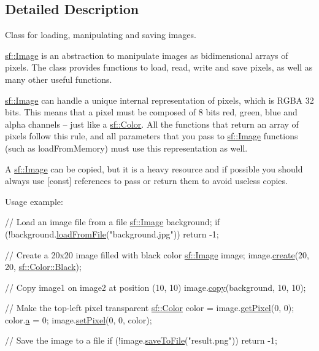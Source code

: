 \subsection{Detailed Description}
Class for loading, manipulating and saving images. 

\hyperlink{classsf_1_1_image}{sf\-::\-Image} is an abstraction to manipulate images as bidimensional arrays of pixels. The class provides functions to load, read, write and save pixels, as well as many other useful functions.

\hyperlink{classsf_1_1_image}{sf\-::\-Image} can handle a unique internal representation of pixels, which is R\-G\-B\-A 32 bits. This means that a pixel must be composed of 8 bits red, green, blue and alpha channels -- just like a \hyperlink{classsf_1_1_color}{sf\-::\-Color}. All the functions that return an array of pixels follow this rule, and all parameters that you pass to \hyperlink{classsf_1_1_image}{sf\-::\-Image} functions (such as load\-From\-Memory) must use this representation as well.

A \hyperlink{classsf_1_1_image}{sf\-::\-Image} can be copied, but it is a heavy resource and if possible you should always use \mbox{[}const\mbox{]} references to pass or return them to avoid useless copies.

Usage example\-: 
\begin{DoxyCode}
\textcolor{comment}{// Load an image file from a file}
\hyperlink{classsf_1_1_image}{sf::Image} background;
\textcolor{keywordflow}{if} (!background.\hyperlink{classsf_1_1_image_a9e4f2aa8e36d0cabde5ed5a4ef80290b}{loadFromFile}(\textcolor{stringliteral}{"background.jpg"}))
    \textcolor{keywordflow}{return} -1;

\textcolor{comment}{// Create a 20x20 image filled with black color}
\hyperlink{classsf_1_1_image}{sf::Image} image;
image.\hyperlink{classsf_1_1_image_a2a67930e2fd9ad97cf004e918cf5832b}{create}(20, 20, \hyperlink{classsf_1_1_color_a25bf5208c8c7668f1a3836acbbb23986}{sf::Color::Black});

\textcolor{comment}{// Copy image1 on image2 at position (10, 10)}
image.\hyperlink{classsf_1_1_image_ab2fa337c956f85f93377dcb52153a45a}{copy}(background, 10, 10);

\textcolor{comment}{// Make the top-left pixel transparent}
\hyperlink{classsf_1_1_color}{sf::Color} color = image.\hyperlink{classsf_1_1_image_a8c8460e311dcb00557cb00a81c29163d}{getPixel}(0, 0);
color.\hyperlink{classsf_1_1_color_a56dbdb47d5f040d9b78ac6a0b8b3a831}{a} = 0;
image.\hyperlink{classsf_1_1_image_a9fd329b8cd7d4439e07fb5d3bb2d9744}{setPixel}(0, 0, color);

\textcolor{comment}{// Save the image to a file}
\textcolor{keywordflow}{if} (!image.\hyperlink{classsf_1_1_image_aec0ed16b67df7b512aaa5c53388ba14e}{saveToFile}(\textcolor{stringliteral}{"result.png"}))
    \textcolor{keywordflow}{return} -1;
\end{DoxyCode}


